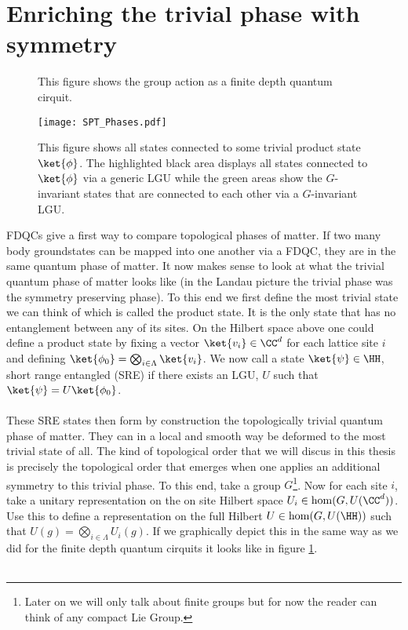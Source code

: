 \section{Enriching the trivial phase with symmetry}\label{sec:enriching-the-trivial-phase-with-symmetry}
\begin{figure}
	\centering
	\scalebox{0.9}{
		
	}
	\caption{This figure shows the group action as a finite depth quantum cirquit.}
	\label{fig:GroupActionQuantumCirquit}
\end{figure}
\begin{figure}
	\centering
	\texttt{[image: SPT\_Phases.pdf]}
	\caption{This figure shows all states connected to some trivial product state $\ket{\phi}$. The highlighted black area displays all states connected to $\ket{\phi}$ via a generic LGU while the green areas show the $G$-invariant states that are connected to each other via a $G$-invariant LGU.}
	\label{fig:ConnectedComponents}
\end{figure}
FDQCs give a first way to compare topological phases of matter. If two many body groundstates can be mapped into one another via a FDQC, they are in the same quantum phase of matter. It now makes sense to look at what the trivial quantum phase of matter looks like (in the Landau picture the trivial phase was the symmetry preserving phase). To this end we first define the most trivial state we can think of which is called the product state. It is the only state that has no entanglement between any of its sites. On the Hilbert space above one could define a product state by fixing a vector $\ket{v_i}\in\CC^d$ for each lattice site $i$ and defining $\ket{\phi_0}=\bigotimes_{i\in\Lambda}\ket{v_i}$. We now call a state $\ket{\psi}\in\HH$, short range entangled (SRE) if there exists an LGU, $U$ such that $\ket{\psi}=U\ket{\phi_0}$.\\\\
These SRE states then form by construction the topologically trivial quantum phase of matter. They can in a local and smooth way be deformed to the most trivial state of all. The kind of topological order that we will discus in this thesis is precisely the topological order that emerges when one applies an additional symmetry to this trivial phase. To this end, take a group $G$\footnote{Later on we will only talk about finite groups but for now the reader can think of any compact Lie Group.}. Now for each site $i$, take a unitary representation on the on site Hilbert space $U_i\in\hom(G,U(\CC^d))$. Use this to define a representation on the full Hilbert $U\in\hom(G,U(\HH))$ such that $U(g)=\bigotimes_{i\in\Lambda}U_i(g)$. If we graphically depict this in the same way as we did for the finite depth quantum cirquits it looks like in figure \ref{fig:GroupActionQuantumCirquit}.\\\\
